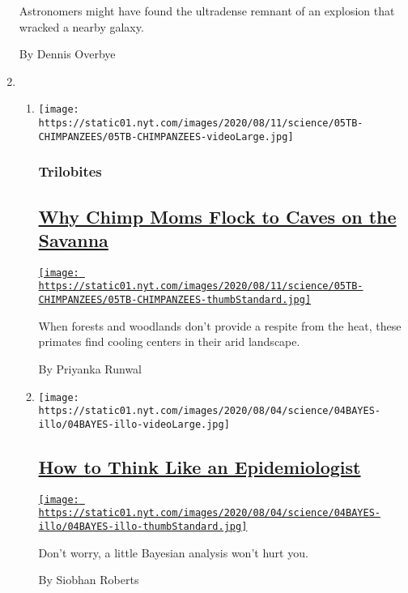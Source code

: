\begin{enumerate}
  Astronomers might have found the ultradense remnant of an explosion
  that wracked a nearby galaxy.

  By Dennis Overbye
\item
  \begin{enumerate}
  \def\labelenumii{\arabic{enumii}.}
  \item
    \texttt{[image: https://static01.nyt.com/images/2020/08/11/science/05TB-CHIMPANZEES/05TB-CHIMPANZEES-videoLarge.jpg]}

    \hypertarget{trilobites-1}{%
    \subsubsection{Trilobites}\label{trilobites-1}}

    \hypertarget{why-chimp-moms-flock-to-caves-on-the-savanna}{%
    \subsection{\texorpdfstring{\href{/2020/08/05/science/chimpanzees-caves-senegal.html}{Why
    Chimp Moms Flock to Caves on the
    Savanna}}{Why Chimp Moms Flock to Caves on the Savanna}}\label{why-chimp-moms-flock-to-caves-on-the-savanna}}

    \href{/2020/08/05/science/chimpanzees-caves-senegal.html}{\texttt{[image: https://static01.nyt.com/images/2020/08/11/science/05TB-CHIMPANZEES/05TB-CHIMPANZEES-thumbStandard.jpg]}}

    When forests and woodlands don't provide a respite from the heat,
    these primates find cooling centers in their arid landscape.

    By Priyanka Runwal
  \item
    \texttt{[image: https://static01.nyt.com/images/2020/08/04/science/04BAYES-illo/04BAYES-illo-videoLarge.jpg]}

    \hypertarget{how-to-think-like-an-epidemiologist}{%
    \subsection{\texorpdfstring{\href{/2020/08/04/science/coronavirus-bayes-statistics-math.html}{How
    to Think Like an
    Epidemiologist}}{How to Think Like an Epidemiologist}}\label{how-to-think-like-an-epidemiologist}}

    \href{/2020/08/04/science/coronavirus-bayes-statistics-math.html}{\texttt{[image: https://static01.nyt.com/images/2020/08/04/science/04BAYES-illo/04BAYES-illo-thumbStandard.jpg]}}

    Don't worry, a little Bayesian analysis won't hurt you.

    By Siobhan Roberts
  \end{enumerate}
\end{enumerate}

